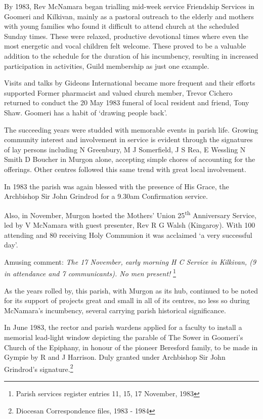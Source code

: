 By 1983, Rev McNamara began trialling mid-week service Friendship
Services in Goomeri and Kilkivan, mainly as a pastoral outreach to the
elderly and mothers with young families who found it difficult to attend
church at the scheduled Sunday times. These were relaxed, productive
devotional times where even the most energetic and vocal children felt
welcome. These proved to be a valuable addition to the schedule for the
duration of his incumbency, resulting in increased participation in
activities, Guild membership as just one example.

Visits and talks by Gideons International became more frequent and their
efforts supported Former pharmacist and valued church member, Trevor
Cichero returned to conduct the 20 May 1983 funeral of local resident
and friend, Tony Shaw. Goomeri has a habit of `drawing people back'.

The succeeding years were studded with memorable events in parish life.
Growing community interest and involvement in service is evident through
the signatures of lay persons including N Greenbury, M J Somerfield, J S
Rea, E Wessling N Smith D Boucher in Murgon alone, accepting simple
chores of accounting for the offerings. Other centres followed this same
trend with great local involvement.

In 1983 the parish was again blessed with the presence of His Grace, the
Archbishop Sir John Grindrod for a 9.30am Confirmation service.

Also, in November, Murgon hosted the Mothers' Union
25\textsuperscript{th} Anniversary Service, led by V McNamara with guest
presenter, Rev R G Walsh (Kingaroy). With 100 attending and 80 receiving
Holy Communion it was acclaimed `a very successful day'.

Amusing comment: \emph{The 17 November, early morning H C Service in
Kilkivan, (9 in attendance and 7 communicants). No men present!}
\footnote{Parish services register entries 11, 15, 17 November, 1983}

As the years rolled by, this parish, with Murgon as its hub, continued
to be noted for its support of projects great and small in all of its
centres, no less so during McNamara's incumbency, several carrying
parish historical significance.

In June 1983, the rector and parish wardens applied for a faculty to
install a memorial lead-light window depicting the parable of The Sower
in Goomeri's Church of the Epiphany, in honour of the pioneer Beresford
family, to be made in Gympie by R and J Harrison. Duly granted under
Archbishop Sir John Grindrod's signature.\footnote{Diocesan
  Correspondence files, 1983 - 1984}

